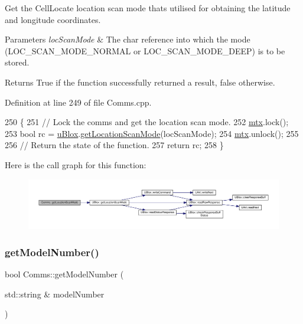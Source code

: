 Get the Cell\+Locate location scan mode that\textquotesingle{}s utilised for obtaining the latitude and longitude coordinates.


\begin{DoxyParams}{Parameters}
{\em loc\+Scan\+Mode} & The char reference into which the mode (L\+O\+C\+\_\+\+S\+C\+A\+N\+\_\+\+M\+O\+D\+E\+\_\+\+N\+O\+R\+M\+AL or L\+O\+C\+\_\+\+S\+C\+A\+N\+\_\+\+M\+O\+D\+E\+\_\+\+D\+E\+EP) is to be stored. \\
\hline
\end{DoxyParams}
\begin{DoxyReturn}{Returns}
True if the function successfully returned a result, false otherwise. 
\end{DoxyReturn}


Definition at line 249 of file Comms.\+cpp.


\begin{DoxyCode}
250 \{
251     \textcolor{comment}{// Lock the comms and get the location scan mode.}
252     \hyperlink{class_comms_a21df861b1202573e4cd0cb5666d638fe}{mtx}.lock();
253     \textcolor{keywordtype}{bool} rc = \hyperlink{class_comms_ac64dea134b116147e5441172346dbd6c}{uBlox}.\hyperlink{class_u_blox_a398db4cdc2d5356fb86b3cd1021bad1b}{getLocationScanMode}(locScanMode);
254     \hyperlink{class_comms_a21df861b1202573e4cd0cb5666d638fe}{mtx}.unlock();
255 
256     \textcolor{comment}{// Return the state of the function.}
257     \textcolor{keywordflow}{return} rc;
258 \}
\end{DoxyCode}
Here is the call graph for this function\+:\nopagebreak
\begin{figure}[H]
\begin{center}
\leavevmode
\includegraphics[width=350pt]{d8/dcc/class_comms_a8f9893e235e62f8fc752f05a06383e68_cgraph}
\end{center}
\end{figure}
\mbox{\label{class_comms_a02eb048febea2d1a39a7fe9e064cf93c}} 
\subsubsection{\texorpdfstring{get\+Model\+Number()}{getModelNumber()}}
{\footnotesize\ttfamily bool Comms\+::get\+Model\+Number (\begin{DoxyParamCaption}\item[{std\+::string \&}]{model\+Number }\end{DoxyParamCaption})}

